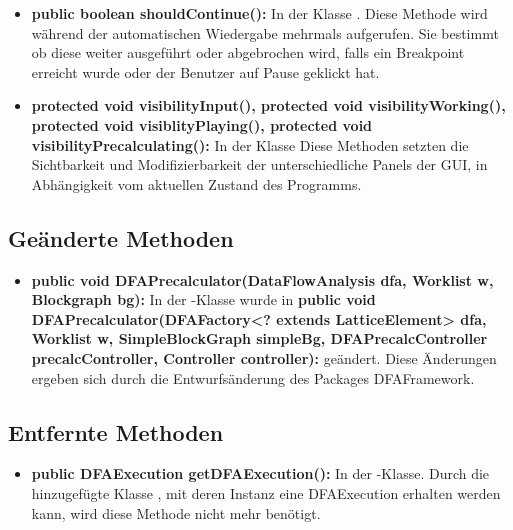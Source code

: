 \begin{itemize}
	\item \textbf{public boolean shouldContinue():} In der Klasse . Diese Methode wird während der automatischen Wiedergabe mehrmals aufgerufen. Sie bestimmt ob diese weiter ausgeführt oder abgebrochen wird, falls ein Breakpoint erreicht wurde oder der Benutzer auf Pause geklickt hat.
	
	\item \textbf{protected void visibilityInput(), protected void visibilityWorking(), protected void visiblityPlaying(), protected void visibilityPrecalculating():} In der Klasse  Diese Methoden setzten die Sichtbarkeit und Modifizierbarkeit der unterschiedliche Panels der GUI, in Abhängigkeit vom aktuellen Zustand des Programms.
\end{itemize}

\subsection{Geänderte Methoden}

\begin{itemize}
	\item \textbf{public void DFAPrecalculator(DataFlowAnalysis dfa, Worklist w, Blockgraph bg):} In der -Klasse wurde in \textbf{public void DFAPrecalculator(DFAFactory<? extends LatticeElement> dfa, Worklist w, SimpleBlockGraph simpleBg, DFAPrecalcController precalcController, Controller controller):} geändert. Diese Änderungen ergeben sich durch die Entwurfsänderung des Packages DFAFramework.
\end{itemize}


\subsection{Entfernte Methoden}

\begin{itemize}
	\item \textbf{public DFAExecution getDFAExecution():} In der -Klasse. Durch die hinzugefügte Klasse , mit deren Instanz eine DFAExecution erhalten werden kann, wird diese Methode nicht mehr benötigt.
\end{itemize}

